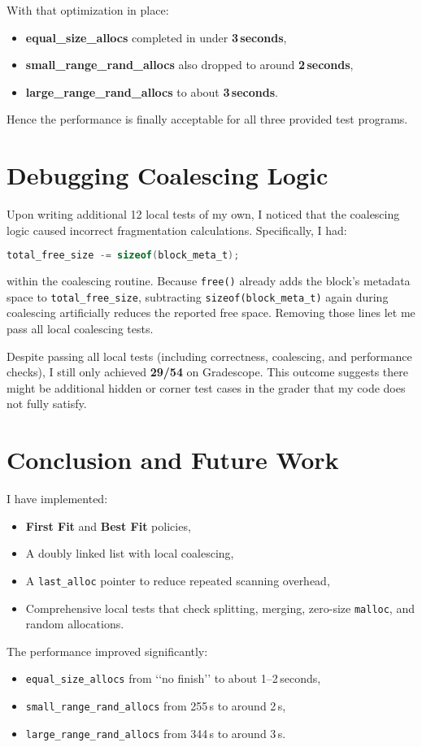 \documentclass[11pt]{article}
\begin{document}
With that optimization in place:
\begin{itemize}
    \item \textbf{equal\_size\_allocs} completed in under \textbf{3\,seconds},
    \item \textbf{small\_range\_rand\_allocs} also dropped to around \textbf{2\,seconds}, 
    \item \textbf{large\_range\_rand\_allocs} to about \textbf{3\,seconds}.
\end{itemize}
Hence the performance is finally acceptable for all three provided test programs.

\section{Debugging Coalescing Logic}
Upon writing additional 12 local tests of my own, I noticed that the coalescing logic caused incorrect fragmentation calculations. Specifically, I had:
\begin{lstlisting}[language=C]
total_free_size -= sizeof(block_meta_t);
\end{lstlisting}
within the coalescing routine. Because \texttt{free()} already adds the block’s metadata space to \texttt{total\_free\_size}, subtracting \texttt{sizeof(block\_meta\_t)} again during coalescing artificially reduces the reported free space. Removing those lines let me pass all local coalescing tests.

Despite passing all local tests (including correctness, coalescing, and performance checks), I still only achieved \textbf{29/54} on Gradescope. This outcome suggests there might be additional hidden or corner test cases in the grader that my code does not fully satisfy. 

\section{Conclusion and Future Work}
I have implemented:
\begin{itemize}
    \item \textbf{First Fit} and \textbf{Best Fit} policies,
    \item A doubly linked list with local coalescing,
    \item A \texttt{last\_alloc} pointer to reduce repeated scanning overhead,
    \item Comprehensive local tests that check splitting, merging, zero-size \texttt{malloc}, and random allocations.
\end{itemize}
The performance improved significantly:
\begin{itemize}
    \item \texttt{equal\_size\_allocs} from ‘‘no finish’’ to about 1--2\,seconds,
    \item \texttt{small\_range\_rand\_allocs} from 255\,s to around 2\,s,
    \item \texttt{large\_range\_rand\_allocs} from 344\,s to around 3\,s.
\end{itemize}
\end{document}
